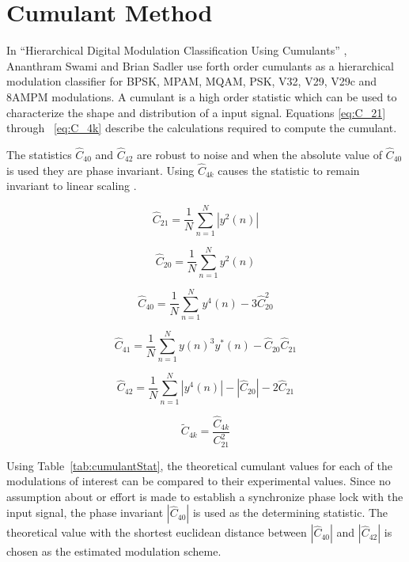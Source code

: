 \chapter{Cumulant Method}

In ``Hierarchical Digital Modulation Classification Using Cumulants''
\cite{swami2000}, Ananthram Swami and Brian Sadler use forth order cumulants as
a hierarchical modulation classifier for BPSK, MPAM, MQAM, PSK, V32, V29, V29c
and 8AMPM modulations. A cumulant is a high order statistic which can be used to
characterize the shape and distribution of a input signal\cite{swami2000}.
Equations \ref{eq:C_21} through ~\ref{eq:C_4k} describe the calculations
required to compute the cumulant.  

The statistics $\hat{C}_{40}$ and $\hat{C}_{42}$ are robust to noise and when
the absolute value of $\hat{C}_{40}$ is used they are phase invariant.  Using
$\hat{C}_{4k}$ causes the statistic to remain invariant to linear scaling
\cite{swami2000}.

\begin{equation}
\hat{C}_{21} = \frac{1}{N} \sum_{n=1}^{N} |y^2(n)|
\label{eq:C_21}
\end{equation}

\begin{equation}
\hat{C}_{20} = \frac{1}{N} \sum_{n=1}^{N} y^2(n)
\label{eq:C_20} 
\end{equation}

\begin{equation}
\hat{C}_{40} = \frac{1}{N} \sum_{n=1}^{N} y^4(n) - 3 \hat{C}_{20}^2
\label{eq:C_40} 
\end{equation}

\begin{equation}
\hat{C}_{41} = \frac{1}{N} \sum_{n=1}^{N} y(n)^3 y^*(n) - \hat{C}_{20}\hat{C}_21
\label{eq:C_41}
\end{equation}

\begin{equation}
\hat{C}_{42} = \frac{1}{N} \sum_{n=1}^{N} |y^4(n)|-|\hat{C}_{20}|-2\hat{C}_{21}
\label{eq:C_42} 
\end{equation}

\begin{equation}
\tilde{C}_{4k} = \frac{\hat{C}_{4k}}{C_{21}^2}
\label{eq:C_4k}  
\end{equation}

Using Table~\ref{tab:cumulantStat}, the theoretical cumulant values for each of
the modulations of interest can be compared to their experimental values.  Since
no assumption about or effort is made to establish a synchronize phase lock with
the input signal, the phase invariant $|\hat{C}_{40}|$ is used as the determining
statistic.  The theoretical value with the shortest euclidean distance between 
$|\hat{C}_{40}|$ and  $|\hat{C}_{42}|$ is chosen as the estimated modulation
scheme.


